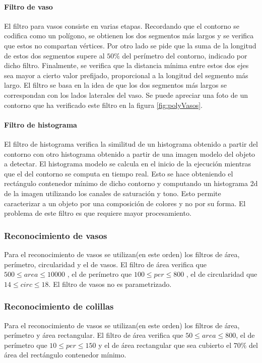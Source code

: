 	\paragraph{Filtro de vaso}
	El filtro para vasos consiste en varias etapas. Recordando que el contorno se codifica como un polígono, se obtienen los dos segmentos 
	más largos y se verifica que estos no compartan vértices. Por otro lado se pide que la suma de la longitud de estos dos segmentos supere al $50\%$ del 
	perímetro del contorno, indicado por dicho filtro. Finalmente, se verifica que la distancia mínima entre estos dos ejes sea mayor a cierto valor prefijado, proporcional a la
	longitud del segmento más largo. El filtro se basa en la idea de que 
	los dos segmentos más largos se correspondan con los lados laterales 
	del vaso.  Se puede apreciar una foto  de un contorno que ha 
	verificado este filtro en la figura \ref{fig:polyVasos}. 
	\paragraph{Filtro de histograma}
	El filtro de histograma verifica la similitud de un histograma obtenido a partir del contorno con otro histograma obtenido a partir de 
	una imagen modelo del objeto a detectar. El histograma modelo se calcula en el inicio de la ejecución mientras que el del contorno se
	computa en tiempo real. Esto se hace obteniendo el rectángulo contenedor mínimo de dicho contorno y computando un histograma 2d de la imagen
	utilizando los canales de saturación y tono. Esto permite caracterizar a un objeto por una composición de colores y no por su forma. El 
	problema de este filtro es que requiere mayor procesamiento.
	
	\subsubsection{Reconocimiento de vasos}
	Para el reconocimiento de vasos se utilizan(en este orden) los filtros de área, perímetro, circularidad y el de vasos.
	El filtro de área verifica que $500 \leq area \leq 10000 $ , el de perímetro que $100 \leq per \leq 800 $ , el de circularidad
	que $14 \leq circ \leq 18$. El filtro de vasos no es parametrizado. 
	
	\subsubsection{Reconocimiento de colillas}
	Para el reconocimiento de vasos se utilizan(en este orden) los filtros de área, perímetro y área rectangular.
	El filtro de área verifica que $50 \leq area \leq 800 $, el de perímetro que $10 \leq per \leq 150 $ y el de área rectangular
	que sea cubierto el $70\%$ del área del rectángulo contenedor mínimo.
	

